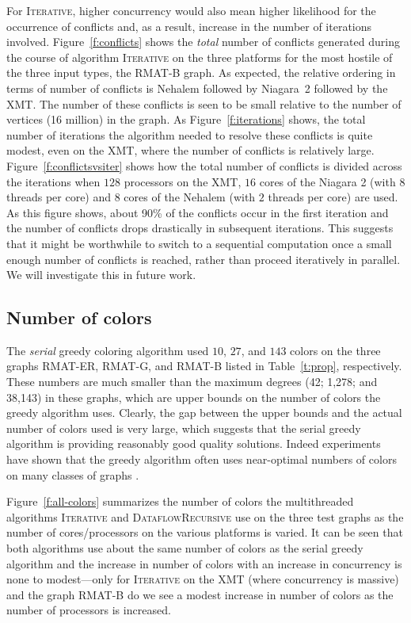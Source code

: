 \documentclass{article}
\begin{document}
For \textsc{Iterative}, higher concurrency would also mean higher likelihood
for the occurrence of conflicts and, as a result, increase in the number of iterations
involved. Figure~\ref{f:conflicts} shows the {\em total} number of conflicts generated during the
course of algorithm \textsc{Iterative} on the three platforms for 
the most hostile of the three input types, the RMAT-B graph. 
As expected, the relative ordering in terms of number of conflicts
is Nehalem followed by Niagara~2 followed by the XMT. 
The number of these conflicts is seen to be small relative to the number of vertices
(16 million) in the graph. 
As Figure~\ref{f:iterations} shows, the total number of iterations the algorithm needed
to resolve these conflicts is quite modest, even on the XMT, 
where the number of conflicts is relatively large.
Figure~\ref{f:conflictsvsiter} shows how the total number of conflicts is divided across 
the iterations when $128$ processors on the XMT, $16$ cores of the Niagara 2 
(with $8$ threads per core) and $8$ cores of the Nehalem 
(with $2$ threads per core) are used. As this figure shows, 
about 90\% of the conflicts occur in the first iteration and 
the number of conflicts drops drastically in subsequent iterations.
This suggests that it might be worthwhile to switch to a sequential computation
once a small enough number of conflicts is reached, rather than proceed iteratively in parallel.
We will investigate this in future work. 



\subsection{Number of colors}
\label{sec:colors}

The {\em serial} greedy coloring algorithm used $10$, $27$, and $143$ 
colors on the three graphs RMAT-ER, RMAT-G, and RMAT-B listed 
in Table~\ref{t:prop},  respectively. 
These numbers are much smaller than the 
maximum degrees (42; 1,278; and 38,143) in these graphs, 
which are upper bounds on the number of colors the greedy algorithm uses. 
Clearly, the gap between the upper bounds and the actual number of colors used is very large,
which suggests that the serial greedy algorithm is providing reasonably 
good quality solutions. Indeed experiments have shown that the greedy algorithm  
often uses near-optimal numbers of colors on many classes of graphs \cite{CoMo:83, colpack-acm}.  

Figure~\ref{f:all-colors} summarizes  the number of colors the multithreaded algorithms 
\textsc{Iterative} and \textsc{DataflowRecursive} use on the three test graphs 
as the number of cores/processors on the various platforms is varied. 
It can be seen that both algorithms use about the same number of colors as the serial greedy algorithm
and the increase in number of colors with an increase in concurrency is 
none to modest---only for \textsc{Iterative} on the XMT 
(where concurrency is massive) and the graph RMAT-B do we see a modest increase
in number of colors as the number of processors is increased.
\end{document}
